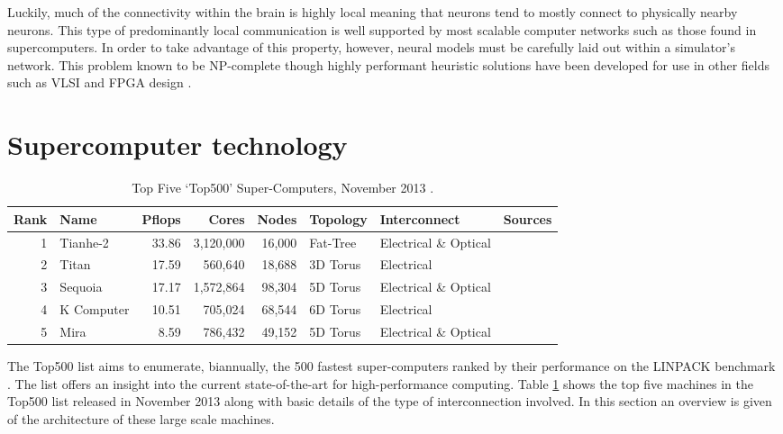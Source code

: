 			Luckily, much of the connectivity within the brain is highly local meaning
			that neurons tend to mostly connect to physically nearby neurons. This
			type of predominantly local communication is well supported by most
			scalable computer networks such as those found in supercomputers. In order
			to take advantage of this property, however, neural models must be
			carefully laid out within a simulator's network. This problem known to be
			NP-complete though highly performant heuristic solutions have been
			developed for use in other fields such as VLSI and FPGA design
			\cite{haldar00}.
		
		
	
	\section{Supercomputer technology}
		\label{sec:supercomputers}
		
		\begin{table}
			\center
			\begin{tabular}{r l r r r l l l}
				\toprule
				Rank & Name    & Pflops& Cores  & Nodes  & Topology & Interconnect          & Sources \\
				\midrule                          
				1 & Tianhe-2   & 33.86 & 3,120,000 & 16,000 & Fat-Tree & Electrical \& Optical & \cite{dongarra13} \\
				2 & Titan      & 17.59 & 560,640   & 18,688 & 3D Torus & Electrical            & \cite{bland12} \\
				3 & Sequoia    & 17.17 & 1,572,864 & 98,304 & 5D Torus & Electrical \& Optical & \cite{prickett10} \\
				4 & K Computer & 10.51 & 705,024   & 68,544 & 6D Torus & Electrical            & \cite{fujitsu11,yokokawa11} \\
				5 & Mira       &  8.59 & 786,432   & 49,152 & 5D Torus & Electrical \& Optical & \cite{prickett10} \\
				\bottomrule
			\end{tabular}
			
			\caption{Top Five `Top500' Super-Computers, November 2013 \cite{meuer13n}.}
			\label{tab:top500}
		\end{table}
		
		The Top500 list \cite{meuer13n} aims to enumerate, biannually, the 500
		fastest super-computers ranked by their performance on the LINPACK benchmark
		\cite{dongarraLINPAC}. The list offers an insight into the current
		state-of-the-art for high-performance computing. Table \ref{tab:top500}
		shows the top five machines in the Top500 list released in November 2013
		along with basic details of the type of interconnection involved. In this
		section an overview is given of the architecture of these large scale
		machines.
		
